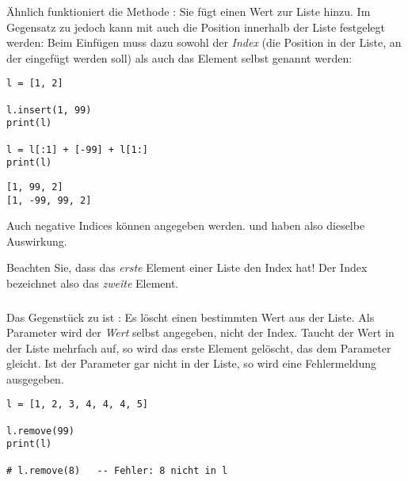 \subsubsection{}
Ähnlich funktioniert die Methode : Sie fügt einen Wert zur Liste hinzu. Im Gegensatz zu  jedoch kann mit  auch die Position innerhalb der Liste festgelegt werden: Beim Einfügen muss dazu sowohl der \emph{Index} (die Position in der Liste, an der eingefügt werden soll) als auch das Element selbst genannt werden:

\begin{codebox}
\begin{verbatim}
l = [1, 2]

l.insert(1, 99)
print(l)

l = l[:1] + [-99] + l[1:]
print(l)
\end{verbatim}
\end{codebox}

\begin{cmdbox}[Ausgabe]
\begin{verbatim}
[1, 99, 2]
[1, -99, 99, 2]
\end{verbatim}
\end{cmdbox}

Auch negative Indices können angegeben werden.  und  haben also dieselbe Auswirkung.

\begin{warnbox}
Beachten Sie, dass das \emph{erste} Element einer Liste den Index  hat! Der Index  bezeichnet also das \emph{zweite} Element. 
\end{warnbox}

\subsubsection{}
Das Gegenstück zu  ist : Es löscht einen bestimmten Wert aus der Liste. Als Parameter wird der \emph{Wert} selbst angegeben, nicht der Index. Taucht der Wert in der Liste mehrfach auf, so wird das erste Element gelöscht, das dem Parameter gleicht. Ist der Parameter gar nicht in der Liste, so wird eine Fehlermeldung ausgegeben.

\begin{codebox}
\begin{verbatim}
l = [1, 2, 3, 4, 4, 4, 5]

l.remove(99)
print(l)

# l.remove(8)   -- Fehler: 8 nicht in l
\end{verbatim}
\end{codebox}

